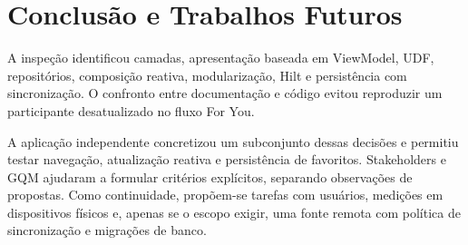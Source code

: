 \section{Conclusão e Trabalhos Futuros}\label{sec:conclusao}
A inspeção identificou camadas, apresentação baseada em ViewModel, UDF,
repositórios, composição reativa, modularização, Hilt e persistência com
sincronização. O confronto entre documentação e código evitou reproduzir um
participante desatualizado no fluxo For You.

A aplicação independente concretizou um subconjunto dessas decisões e
permitiu testar navegação, atualização reativa e persistência de favoritos.
Stakeholders e GQM ajudaram a formular critérios explícitos, separando
observações de propostas. Como continuidade, propõem-se tarefas com usuários,
medições em dispositivos físicos e, apenas se o escopo exigir, uma fonte
remota com política de sincronização e migrações de banco.
